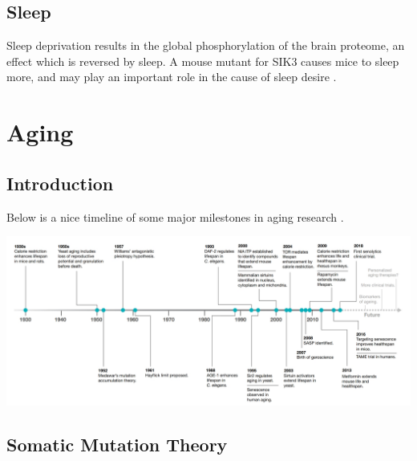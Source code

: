 \documentclass[]{book}
\newenvironment{Shaded}{\begin{snugshade}}{\end{snugshade}}
\newcommand{\DataTypeTok}[1]{\textcolor[rgb]{0.13,0.29,0.53}{#1}}
\newcommand{\DecValTok}[1]{\textcolor[rgb]{0.00,0.00,0.81}{#1}}
\newcommand{\KeywordTok}[1]{\textcolor[rgb]{0.13,0.29,0.53}{\textbf{#1}}}
\newcommand{\NormalTok}[1]{#1}
\newcommand{\OperatorTok}[1]{\textcolor[rgb]{0.81,0.36,0.00}{\textbf{#1}}}
\newcommand{\OtherTok}[1]{\textcolor[rgb]{0.56,0.35,0.01}{#1}}
\newcommand{\StringTok}[1]{\textcolor[rgb]{0.31,0.60,0.02}{#1}}
\begin{document}
\hypertarget{sleep}{%
\section{Sleep}\label{sleep}}

Sleep deprivation results in the global phosphorylation of the brain proteome, an effect which is reversed by sleep. A mouse mutant for SIK3 causes mice to sleep more, and may play an important role in the cause of sleep desire \citep{wang2018quantitative}.

\hypertarget{aging}{%
\chapter{Aging}\label{aging}}

\hypertarget{introduction-2}{%
\section{Introduction}\label{introduction-2}}

Below is a nice timeline of some major milestones in aging research \citep{campisi2019discoveries}.

\begin{Shaded}
\end{Shaded}

\includegraphics{images/04-8.jpg}

\hypertarget{somatic-mutation-theory}{%
\section{Somatic Mutation Theory}\label{somatic-mutation-theory}}
\end{document}
